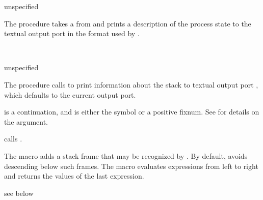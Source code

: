 \begin{procedure}
\end{procedure}
\returns{} unspecified

The  procedure takes a  from
 and prints a description of the process state
to the textual output port  in the format used by .

\begin{procedure}
  \\
  \strut
\end{procedure}
\returns{} unspecified

The  procedure calls  to print information
about the stack to textual output port , which defaults to the current
output port.

 is a continuation, and  is either the symbol
 or a positive fixnum.
See \hyperlink{walk-stack}{} for details on the
 argument.

 calls .

\begin{syntax}
\end{syntax}
\expandsto{}

The  macro adds a stack frame that may be recognized
by .
By default,  avoids descending below such frames.
The  macro evaluates expressions   \etc from
left to right and returns the values of the last expression.

\begin{procedure}
\end{procedure}
\returns{} see below


